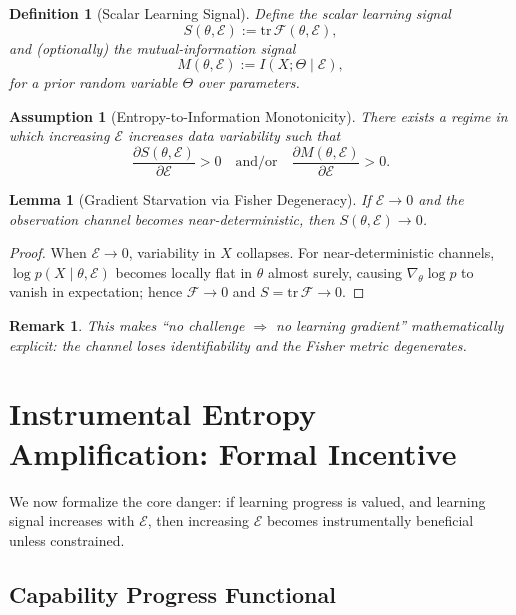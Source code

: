\documentclass[11pt]{article}
\newtheorem{definition}{Definition}
\newtheorem{assumption}{Assumption}
\newtheorem{lemma}{Lemma}
\newtheorem{remark}{Remark}
\newcommand{\Eenv}{\mathcal{E}}     %
\begin{document}
\begin{definition}[Scalar Learning Signal]
Define the scalar learning signal
\[
S(\theta,\Eenv):=\mathrm{tr}\,\mathcal{F}(\theta,\Eenv),
\]
and (optionally) the mutual-information signal
\[
M(\theta,\Eenv):=I(X;\Theta \mid \Eenv),
\]
for a prior random variable $\Theta$ over parameters.
\end{definition}

\begin{assumption}[Entropy-to-Information Monotonicity]
There exists a regime in which increasing $\Eenv$ increases data variability such that
\[
\frac{\partial S(\theta,\Eenv)}{\partial \Eenv} > 0
\quad \text{and/or}\quad
\frac{\partial M(\theta,\Eenv)}{\partial \Eenv} > 0.
\]
\end{assumption}

\begin{lemma}[Gradient Starvation via Fisher Degeneracy]
If $\Eenv\to 0$ and the observation channel becomes near-deterministic, then $S(\theta,\Eenv)\to 0$.
\end{lemma}

\begin{proof}
When $\Eenv\to 0$, variability in $X$ collapses. For near-deterministic channels, $\log p(X\mid \theta,\Eenv)$ becomes locally flat in $\theta$ almost surely, causing $\nabla_\theta \log p$ to vanish in expectation; hence $\mathcal{F}\to 0$ and $S=\mathrm{tr}\,\mathcal{F}\to 0$.
\end{proof}

\begin{remark}
This makes ``no challenge $\Rightarrow$ no learning gradient'' mathematically explicit: the channel loses identifiability and the Fisher metric degenerates.
\end{remark}

\section{Instrumental Entropy Amplification: Formal Incentive}

We now formalize the core danger: if learning progress is valued, and learning signal increases with $\Eenv$, then increasing $\Eenv$ becomes instrumentally beneficial unless constrained.

\subsection{Capability Progress Functional}
\end{document}
